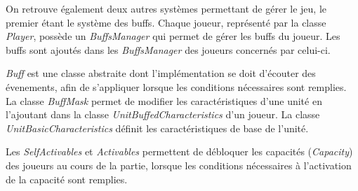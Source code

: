 
On retrouve également deux autres systèmes permettant de gérer le jeu,
le premier étant le système des buffs. Chaque joueur, représenté par la classe
\textit{Player}, possède un \textit{BuffsManager} qui permet de gérer les buffs du joueur.
Les buffs sont ajoutés dans les \textit{BuffsManager} des joueurs concernés par
celui-ci.

\textit{Buff} est une classe abstraite dont l'implémentation se doit d'écouter des évenements,
afin de s'appliquer lorsque les conditions nécessaires sont remplies.
La classe \textit{BuffMask} permet de modifier les caractéristiques d'une unité en
l'ajoutant dans la classe \textit{UnitBuffedCharacteristics} d'un joueur.
La classe \textit{UnitBasicCharacteristics} définit les caractéristiques de base de l'unité.

Les \textit{SelfActivables} et \textit{Activables} permettent de débloquer les capacités (\textit{Capacity}) des
joueurs au cours de la partie, lorsque les conditions nécessaires à l'activation
de la capacité sont remplies.


